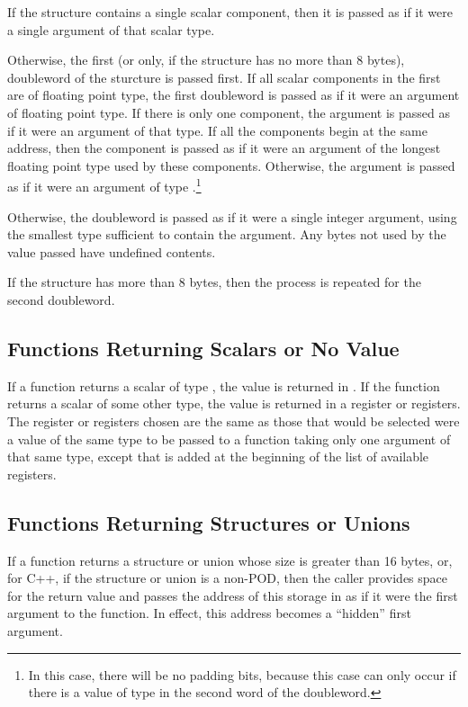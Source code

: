 If the structure contains a single scalar component, then it is passed
as if it were a single argument of that scalar type.

Otherwise, the first (or only, if the structure has no more than 8
bytes), doubleword of the sturcture is passed first.  If all scalar
components in the first are of floating point type, the first
doubleword is passed as if it were an argument of floating point type.
If there is only one component, the argument is passed as if it were
an argument of that type.  If all the components begin at the same
address, then the component is passed as if it were an argument of the
longest floating point type used by these components.  Otherwise, the
argument is passed as if it were an argument of type
.\footnote{In this case, there will be no padding
  bits, because this case can only occur if there is a value of type
   in the second word of the doubleword.}

Otherwise, the doubleword is passed as if it were a single integer
argument, using the smallest type sufficient to contain the argument.
Any bytes not used by the value passed have undefined contents.  

If the structure has more than 8 bytes, then the process is repeated
for the second doubleword.

\subsection{Functions Returning Scalars or No Value}

If a function returns a scalar of type , the value is
returned in .  If the function returns a scalar of some other
type, the value is returned in a register or registers.  The register
or registers chosen are the same as those that would be selected were
a value of the same type to be passed to a function taking only one
argument of that same type, except that \RAX is added at the beginning
of the list of available registers.

\subsection{Functions Returning Structures or Unions}

If a function returns a structure or union whose size is greater than
16 bytes, or, for C++, if the structure or union is a non-POD, then
the caller provides space for the return value and passes the address
of this storage in \RBX as if it were the first argument to the
function.  In effect, this address becomes a ``hidden'' first
argument.

